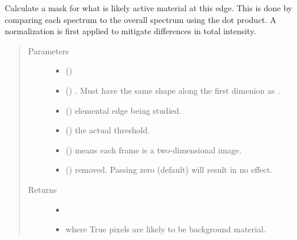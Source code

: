 \documentclass[letterpaper,10pt,english]{sphinxmanual}
\begin{document}
\begin{fulllineitems}
\label{\detokenize{xanespy:xanespy.xanes_math.l_edge_mask}}
Calculate a mask for what is likely active material at this
edge. This is done by comparing each spectrum to the overall
spectrum using the dot product. A normalization is first applied
to mitigate differences in total intensity.
\begin{quote}\begin{description}
\item[{Parameters}] \leavevmode\begin{itemize}
\item {} 
 (\sphinxstyleliteralemphasis{-}) \textendash{} 

\item {} 
 (\sphinxstyleliteralemphasis{-}) \textendash{} . Must have the same shape along the first dimenion as
.

\item {} 
 (\sphinxstyleliteralemphasis{-}) \textendash{} elemental edge being studied.

\item {} 
 (\sphinxstyleliteralemphasis{-}) \textendash{} the actual threshold.

\item {} 
 (\sphinxstyleliteralemphasis{-}) \textendash{} means each frame is a two-dimensional image.

\item {} 
 (\sphinxstyleliteralemphasis{-}) \textendash{} removed. Passing zero (default) will result in no effect.

\end{itemize}

\item[{Returns}] \leavevmode
\begin{itemize}
\item {} 

\item {} 
 where True pixels are likely to be background material.

\end{itemize}


\end{description}\end{quote}

\end{fulllineitems}
\end{document}
